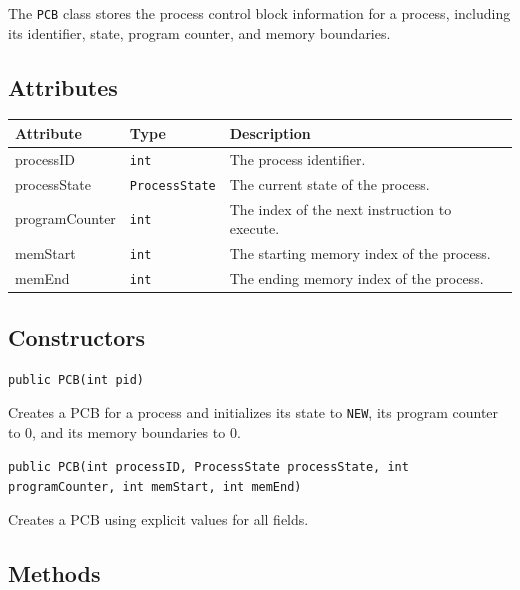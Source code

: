 \documentclass[12pt,a4paper]{article}
\begin{document}
\begin{purposebox}
The \texttt{PCB} class stores the process control block information for a process, including its identifier, state, program counter, and memory boundaries.
\end{purposebox}

\subsection{Attributes}

\begin{tabularx}{\textwidth}{p{4cm} p{3cm} Y}
\toprule
\textbf{Attribute} & \textbf{Type} & \textbf{Description} \\
\midrule
processID & \texttt{int} & The process identifier. \\
processState & \texttt{ProcessState} & The current state of the process. \\
programCounter & \texttt{int} & The index of the next instruction to execute. \\
memStart & \texttt{int} & The starting memory index of the process. \\
memEnd & \texttt{int} & The ending memory index of the process. \\
\bottomrule
\end{tabularx}

\subsection{Constructors}

\begin{signaturebox}
\texttt{public PCB(int pid)}
\end{signaturebox}

Creates a PCB for a process and initializes its state to \texttt{NEW}, its program counter to 0, and its memory boundaries to 0.

\begin{signaturebox}
\texttt{public PCB(int processID, ProcessState processState, int programCounter, int memStart, int memEnd)}
\end{signaturebox}

Creates a PCB using explicit values for all fields.

\subsection{Methods}
\end{document}
